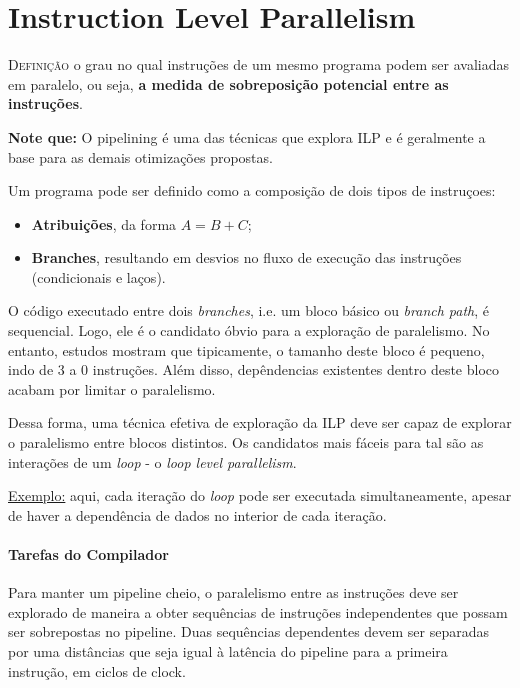 \chapter{Instruction Level Parallelism}

\textsc{Definição} o grau no qual instruções de um mesmo programa podem ser avaliadas em paralelo, ou seja, \textbf{a medida de sobreposição potencial entre as instruções}.

\textbf{Note que:} O pipelining é uma das técnicas que explora ILP e é geralmente a base para as demais otimizações propostas.

Um programa pode ser definido como a composição de dois tipos de instruçoes:
\begin{itemize}
  \item \textbf{Atribuições}, da forma $A = B + C$;

  \item \textbf{Branches}, resultando em desvios no fluxo de execução das instruções (condicionais e laços).
\end{itemize}

O código executado entre dois \textit{branches}, i.e. um bloco básico ou \textit{branch path}, é sequencial. Logo, ele é o candidato óbvio para a exploração de paralelismo. No entanto, estudos mostram que tipicamente, o tamanho deste bloco é pequeno, indo de 3 a 0 instruções. Além disso, depêndencias existentes dentro deste bloco acabam por limitar o paralelismo.

Dessa forma, uma técnica efetiva de exploração da ILP deve ser capaz de explorar o paralelismo entre blocos distintos. Os candidatos mais fáceis para tal são as interações de um \textit{loop} - o \textit{loop level parallelism}.

\underline{Exemplo:} aqui, cada iteração do \textit{loop} pode ser executada simultaneamente, apesar de haver a dependência de dados no interior de cada iteração.

\subsubsection{Tarefas do Compilador}
Para manter um pipeline cheio, o paralelismo entre as instruções deve ser explorado de maneira a obter sequências de instruções independentes que possam ser sobrepostas no pipeline. Duas sequências dependentes devem ser separadas por uma distâncias que seja igual à latência do pipeline para a primeira instrução, em ciclos de clock.

